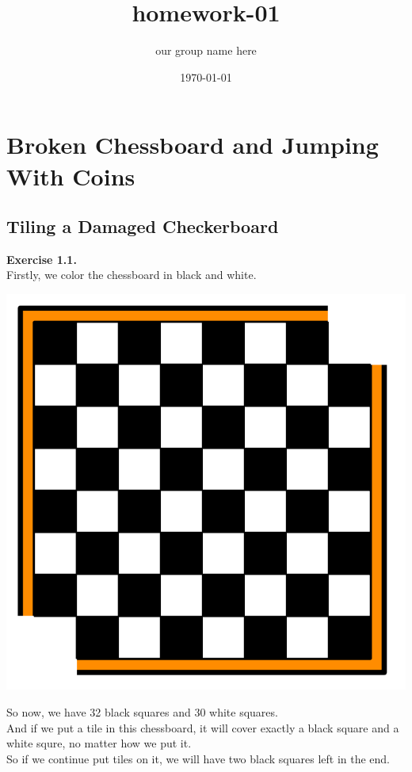 \documentclass{article}
\title{\textbf{homework-01}}
\author{our group name here}
\date{\today}
\begin{document}
\maketitle

\section{Broken Chessboard and Jumping With Coins}
\subsection{Tiling a Damaged Checkerboard}

\begin{flushleft}
\textbf{Exercise 1.1.} \\
Firstly, we color the chessboard in black and white.\\
\begin{center}
\includegraphics[scale=0.3]{1_1_1.png}
\end{center}
So now, we have 32 black squares and 30 white squares.\\
And if we put a tile in this chessboard, it will cover exactly a black square and a white squre, no matter how we put it.\\
So if we continue put tiles on it, we will have two black squares left in the end.\\

\end{flushleft}
\end{document}
